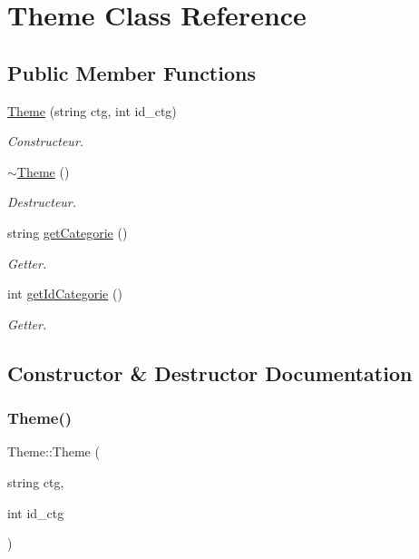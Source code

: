 \hypertarget{classTheme}{}\section{Theme Class Reference}
\label{classTheme}
\subsection*{Public Member Functions}
\begin{DoxyCompactItemize}
\item 
\mbox{\hyperlink{classTheme_a3260e0ed545096f56d8feb776606d197}{Theme}} (string ctg, int id\+\_\+ctg)
\begin{DoxyCompactList}\small\item\em Constructeur. \end{DoxyCompactList}\item 
\mbox{\hyperlink{classTheme_afc1ece6aa5135b98e14dddac7dddbda8}{$\sim$\+Theme}} ()
\begin{DoxyCompactList}\small\item\em Destructeur. \end{DoxyCompactList}\item 
string \mbox{\hyperlink{classTheme_a3107feac34af5ae1f6422ee4187c349c}{get\+Categorie}} ()
\begin{DoxyCompactList}\small\item\em Getter. \end{DoxyCompactList}\item 
int \mbox{\hyperlink{classTheme_ae89eff94270ba058da2a78f974271bab}{get\+Id\+Categorie}} ()
\begin{DoxyCompactList}\small\item\em Getter. \end{DoxyCompactList}\end{DoxyCompactItemize}


\subsection{Constructor \& Destructor Documentation}
\mbox{\label{classTheme_a3260e0ed545096f56d8feb776606d197}} 
\subsubsection{\texorpdfstring{Theme()}{Theme()}}
{\footnotesize\ttfamily Theme\+::\+Theme (\begin{DoxyParamCaption}\item[{string}]{ctg,  }\item[{int}]{id\+\_\+ctg }\end{DoxyParamCaption})}



